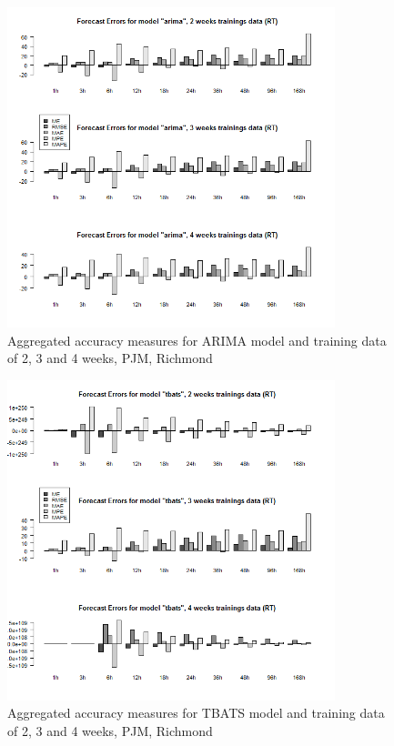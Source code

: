\begin{figure}[!ht]
	\centering
		\includegraphics[width=0.85\textwidth]{figures/appendix_forecast_results/rt_sim_6_x_1w_1w_arima.png}
	\caption{Aggregated accuracy measures for ARIMA model and training data of 2, 3 and 4 weeks, PJM, Richmond}
	\label{fig:app_rt_sim_6_x_1w_1w_arima}
	\vspace*{-1.6in}
\end{figure}




\begin{figure}[!ht]
	\centering
		\includegraphics[width=0.85\textwidth]{figures/appendix_forecast_results/rt_sim_6_x_1w_1w_tbats.png}
	\caption{Aggregated accuracy measures for TBATS model and training data of 2, 3 and 4 weeks, PJM, Richmond}
	\label{fig:app_rt_sim_6_x_1w_1w_tbats}
\end{figure}

